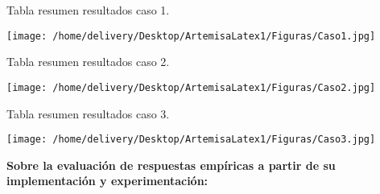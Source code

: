 \documentclass[a4paper,12pt]{report}
\begin{document}
\begin{table}[h!]
\caption{Tabla resumen resultados caso 1.}
\centering
\texttt{[image: /home/delivery/Desktop/ArtemisaLatex1/Figuras/Caso1.jpg]}
\label{tabla_resumen_caso1}
\end{table}

\begin{table}[h!]
\caption{Tabla resumen resultados caso 2.}
\centering
\texttt{[image: /home/delivery/Desktop/ArtemisaLatex1/Figuras/Caso2.jpg]}
\label{tabla_resumen_caso2}
\end{table}

\begin{table}[h!]
\caption{Tabla resumen resultados caso 3.}
\centering
\texttt{[image: /home/delivery/Desktop/ArtemisaLatex1/Figuras/Caso3.jpg]}
\label{tabla_resumen_caso3}
\end{table}

\pagebreak

\textbf{Sobre la evaluación de respuestas empíricas a partir de su implementación y
experimentación:}
\end{document}
